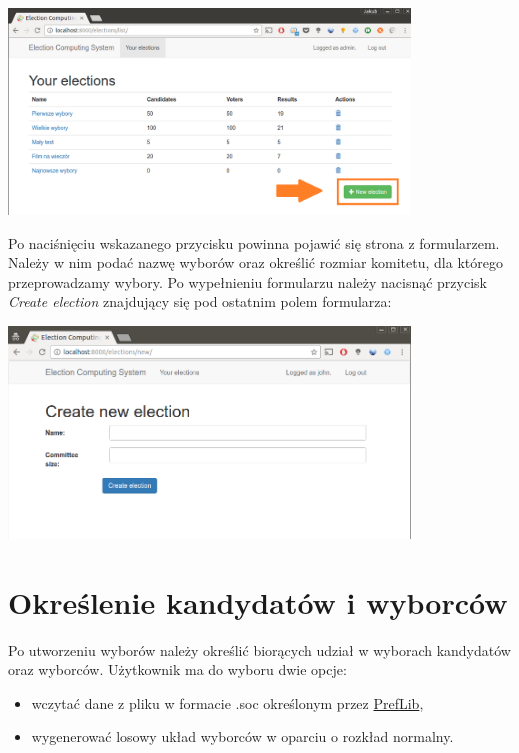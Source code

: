 \documentclass[pdflatex,11pt]{../aghdoc_version2}
\begin{document}
\begin{center}
\includegraphics[width=0.8\textwidth]{pics/new_election_button.png}
\end{center}

\vspace{\baselineskip}
Po naciśnięciu wskazanego przycisku powinna pojawić się strona z formularzem. Należy w nim podać nazwę wyborów oraz określić rozmiar komitetu, dla którego przeprowadzamy wybory. Po wypełnieniu formularzu należy nacisnąć przycisk \textit{Create election} znajdujący się pod ostatnim polem formularza: \\

\begin{center}
\includegraphics[width=0.8\textwidth]{pics/elections-new.png}
\end{center}

\newpage
\section{Określenie kandydatów i wyborców}
\label{sec:electionsnewlycreated}

Po utworzeniu wyborów należy określić biorących udział w wyborach kandydatów oraz wyborców.
Użytkownik ma do wyboru dwie opcje:
\begin{itemize}
\item wczytać dane z pliku w formacie .soc określonym przez \href{http://www.preflib.org/}{PrefLib},
\item wygenerować losowy układ wyborców w oparciu o rozkład normalny.
\end{itemize}
\end{document}

